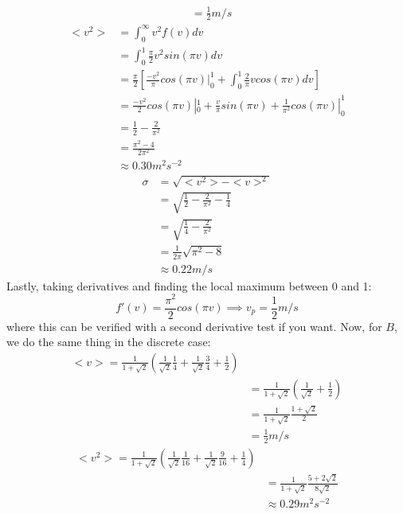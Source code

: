 \documentclass{article}
\begin{document}
\begin{itemize}
\begin{align*}
	&= \frac{1}{2} m/s
	\end{align*}
	\begin{align*}
	<v^2> &= \int_0^{\infty} v^2f(v)dv \\
	&= \int_0^1 \frac{\pi}{2}v^2sin(\pi v)dv \\
	&= \frac{\pi}{2}\left[\frac{-v^2}{\pi}cos(\pi v)|_0^1 + \int_0^1\frac{2}{\pi}vcos(\pi v)dv\right] \\
	&= \frac{-v^2}{2}cos(\pi v)|_0^1 + \frac{v}{\pi} sin(\pi v) + \frac{1}{\pi^2}cos(\pi v)|_0^1 \\
	&= \frac{1}{2} - \frac{2}{\pi^2} \\
	&= \frac{\pi^2-4}{2\pi^2} \\
	&\approx 0.30 m^2 s^{-2}
	\end{align*}
	\begin{align*}
	\sigma &= \sqrt{<v^2>-<v>^2} \\
	&= \sqrt{\frac{1}{2}-\frac{2}{\pi^2}-\frac{1}{4}} \\
	&= \sqrt{\frac{1}{4}-\frac{2}{\pi^2}} \\
	&= \frac{1}{2\pi}\sqrt{\pi^2-8} \\
	&\approx 0.22 m/s
	\end{align*}
	Lastly, taking derivatives and finding the local maximum between 0 and 1:
	\begin{equation}
	f'(v) = \frac{\pi^2}{2}cos(\pi v) \implies v_p=\frac{1}{2} m/s
	\end{equation}
	where this can be verified with a second derivative test if you want.
	Now, for $B$, we do the same thing in the discrete case:
	\begin{align*}
	<v> = \frac{1}{1+\sqrt{2}}\left(\frac{1}{\sqrt{2}}\frac{1}{4} + \frac{1}{\sqrt{2}}\frac{3}{4} + \frac{1}{2}\right) \\
	&= \frac{1}{1+\sqrt{2}}\left(\frac{1}{\sqrt{2}}+\frac{1}{2}\right) \\
	&= \frac{1}{1+\sqrt{2}}\frac{1+\sqrt{2}}{2} \\
	&= \frac{1}{2} m/s
	\end{align*}
	\begin{align*}
	<v^2> = \frac{1}{1+\sqrt{2}}\left(\frac{1}{\sqrt{2}}\frac{1}{16} + \frac{1}{\sqrt{2}}\frac{9}{16} + \frac{1}{4}\right) \\
	&= \frac{1}{1+\sqrt{2}}\frac{5+2\sqrt{2}}{8\sqrt{2}} \\
	&\approx 0.29 m^2 s^{-2} \\
	\end{align*}
	\begin{align*}

\end{align*}
\end{itemize}
\end{document}
